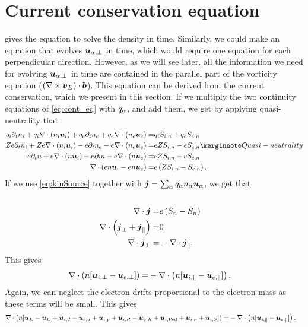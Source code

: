 \section{Current conservation equation}
%
 gives the equation to solve the density in time.
Similarly, we could make an equation that evolves $\boldsymbol{u}_{\alpha,\perp}$ in time, which would require one equation for each perpendicular direction.
However, as we will see later, all the information we need for evolving $\boldsymbol{u}_{\alpha,\perp}$ in time are contained in the parallel part of the vorticity equation ($(\nabla\times \boldsymbol{v}_E)\cdot \boldsymbol{b}$).
This equation can be derived from the current conservation, which we present in this section.
If we multiply the two continuity equations of \cref{eq:cont_eq} with $q_\alpha$, and add them, we get by applying quasi-neutrality that
%
\begin{align*}
    q_i\partial_t n_i + q_i\div (n_i \ve{u}_i)
    + q_e\partial_t n_e + q_e\div (n_e \ve{u}_e)
    =&
    q_iS_{i,n} + q_eS_{e,n}
    \\
    Ze\partial_t n_i + Ze\div (n_i \ve{u}_i)
    - e\partial_t n_e - e\div (n_e \ve{u}_e)
    =&
    eZS_{i,n} - eS_{e,n}
    \note{Quasi-neutrality}
    \\
    e\partial_t n + e\div (n \ve{u}_i)
    - e\partial_t n - e\div (n \ve{u}_e)
    =&
    eZS_{i,n} - eS_{e,n}
    \\
    \div (en \ve{u}_i - en \ve{u}_e) =&
    e\L(ZS_{i,n} - S_{e,n}\R).
\end{align*}
%
If we use \cref{eq:kinSource} together with $\boldsymbol{j} = \sum_{\alpha}q_\alpha n_\alpha\boldsymbol{u}_\alpha$, we get that
%
\begin{align*}
    \\
    \nabla\cdot \boldsymbol{j} =&
    e\left(S_{n} - S_{n}\right)
    \\
    \nabla\cdot \left( \boldsymbol{j}_\perp + \boldsymbol{j}_\|\right)=& 0
    \\
    \nabla\cdot \boldsymbol{j}_\perp =& -\nabla\cdot \boldsymbol{j}_\|.
\end{align*}
%
This gives
%
\begin{align*}
    \nabla\cdot \left( n [\boldsymbol{u}_{i,\perp} - \boldsymbol{u}_{e,\perp}] \right) =&
    -\nabla\cdot \left(n [\boldsymbol{u}_{i,\|} - \boldsymbol{u}_{e,\|}]\right).
\end{align*}
%
Again, we can neglect the electron drifts proportional to the electron mass as these terms will be small.
This gives
%
\begin{align}
    \nabla\cdot \left( n [
   \boldsymbol{u}_{E} - \boldsymbol{u}_{E}
  +\boldsymbol{u}_{i,d} - \boldsymbol{u}_{e,d}
  +\boldsymbol{u}_{i,p}
  +\boldsymbol{u}_{i,R} - \boldsymbol{u}_{e,R}
  +\boldsymbol{u}_{i,\text{Ped}}
  +\boldsymbol{u}_{i,\nu}
  +\boldsymbol{u}_{i,S}
  ] \right) =&
  -\nabla\cdot \left(n [\boldsymbol{u}_{i,\|} - \boldsymbol{u}_{e,\|}]\right).
  \label{eq:current_drifts}
\end{align}
